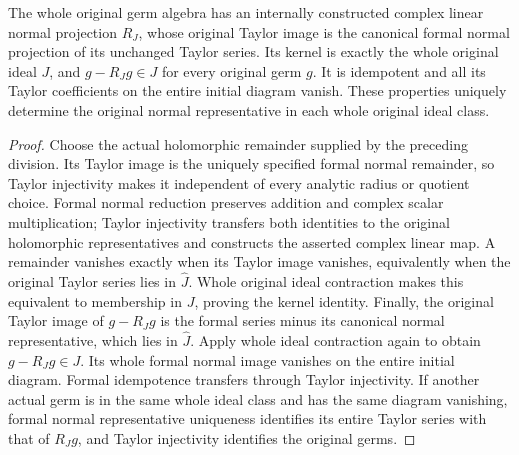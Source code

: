 \begin{theorem}
\label{hir:actual-original-analytic-normal-projection}
\leanok
The whole original germ algebra has an internally constructed complex linear
normal projection $R_J$, whose original Taylor image is the canonical formal
normal projection of its unchanged Taylor series. Its kernel is exactly the
whole original ideal $J$, and $g-R_Jg\in J$ for every original germ $g$.
It is idempotent and all its Taylor coefficients on the entire initial diagram
vanish. These properties uniquely determine the original normal representative
in each whole original ideal class.
\end{theorem}
\begin{proof}
Choose the actual holomorphic remainder supplied by the preceding division.
Its Taylor image is the uniquely specified formal normal remainder, so
Taylor injectivity makes it independent of every analytic radius or quotient
choice. Formal normal reduction preserves addition and complex scalar
multiplication; Taylor injectivity transfers both identities to the original
holomorphic representatives and constructs the asserted complex linear map.
A remainder vanishes exactly when its Taylor image vanishes, equivalently
when the original Taylor series lies in $\widehat J$. Whole original ideal
contraction makes this equivalent to membership in $J$, proving the kernel
identity. Finally, the original Taylor image of $g-R_Jg$ is the formal series
minus its canonical normal representative, which lies in $\widehat J$.
Apply whole ideal contraction again to obtain $g-R_Jg\in J$. Its whole
formal normal image vanishes on the entire initial diagram. Formal
idempotence transfers through Taylor injectivity. If another actual germ
is in the same whole ideal class and has the same diagram vanishing,
formal normal representative uniqueness identifies its entire Taylor
series with that of $R_Jg$, and Taylor injectivity identifies the original germs.
\end{proof}

